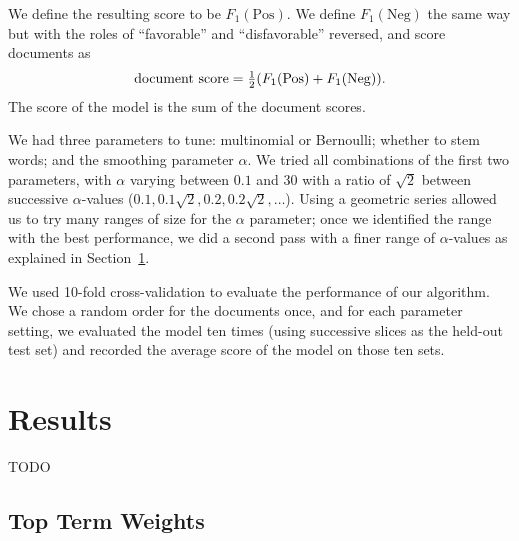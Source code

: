 \documentclass{article}
\newcommand{\PosC}{\mathrm{Pos}}
\newcommand{\NegC}{\mathrm{Neg}}
\begin{document}
We define the resulting score to be \(F_1(\PosC)\).
We define \(F_1(\NegC)\) the same way but with the roles of ``favorable'' and ``disfavorable'' reversed, and score documents as
\[\text{document score}=\tfrac12 (F_1(\PosC) + F_1(\NegC)) \ldotp\]
The score of the model is the sum of the document scores.

We had three parameters to tune: multinomial or Bernoulli; whether to stem words; and the smoothing parameter \(\alpha\).  We tried all combinations of the first two parameters, with \(\alpha\) varying between \(0.1\) and \(30\) with a ratio of \(\sqrt{2}\) between successive \(\alpha\)-values (\(0.1, 0.1\sqrt{2}, 0.2, 0.2\sqrt{2}, \dotsc\)).  Using a geometric series allowed us to try many ranges of size for the \(\alpha\) parameter; once we identified the range with the best performance, we did a second pass with a finer range of \(\alpha\)-values as explained in Section~\ref{sec:Results}.

We used 10-fold cross-validation to evaluate the performance of our algorithm.  We chose a random order for the documents once, and for each parameter setting, we evaluated the model ten times (using successive slices as the held-out test set) and recorded the average score of the model on those ten sets.

\section{Results}
\label{sec:Results}

TODO

\subsection{Top Term Weights}

\end{document}
